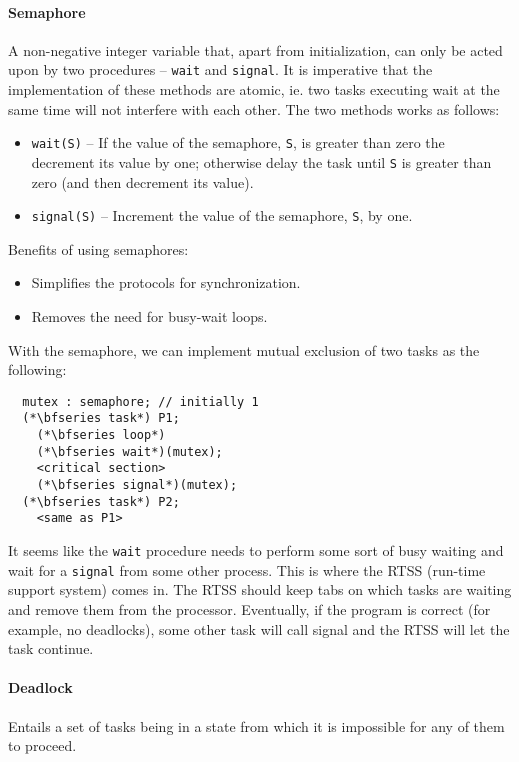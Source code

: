 \paragraph{Semaphore} A non-negative integer variable that, apart from initialization, can only be acted upon by two procedures -- \verb|wait| and \verb|signal|. It is imperative that the implementation of these methods are atomic, ie. two tasks executing wait at the same time will not interfere with each other. The two methods works as follows:
\begin{itemize}[nolistsep,noitemsep]
  \item \verb|wait(S)| -- If the value of the semaphore, \verb|S|, is greater than zero the decrement its value by one; otherwise delay the task until \verb|S| is greater than zero (and then decrement its value).
  \item \verb|signal(S)| -- Increment the value of the semaphore, \verb|S|, by one.
\end{itemize}

Benefits of using semaphores:
\begin{itemize}[nolistsep,noitemsep]
  \item Simplifies the protocols for synchronization.
  \item Removes the need for busy-wait loops.
\end{itemize}

With the semaphore, we can implement mutual exclusion of two tasks as the following:
%
\begin{lstlisting}
  mutex : semaphore; // initially 1
  (*\bfseries task*) P1;
    (*\bfseries loop*)
    (*\bfseries wait*)(mutex);
    <critical section>
    (*\bfseries signal*)(mutex);
  (*\bfseries task*) P2;
    <same as P1>
\end{lstlisting}

It seems like the \verb|wait| procedure needs to perform some sort of busy waiting and wait for a \verb|signal| from some other process. This is where the RTSS (run-time support system) comes in. The RTSS should keep tabs on which tasks are waiting and remove them from the processor. Eventually, if the program is correct (for example, no deadlocks), some other task will call signal and the RTSS will let the task continue.

\paragraph{Deadlock} Entails a set of tasks being in a state from which it
is impossible for any of them to proceed.

